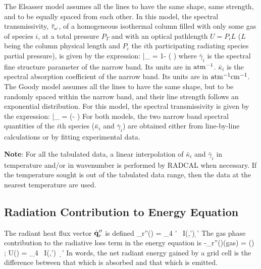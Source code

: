 The Elsasser model assumes all the lines to have the same shape, same strength,
and to be equally spaced from each other. In this model, the spectral
transmissivity, $\bar{\tau}_{\omega}$, of a homogeneous isothermal column filled
with only some gas of species $i$,
at a total pressure $P_T$ and with an optical pathlength $U = P_i L$ ($L$
being the column physical length and $P_i$ the $i$th participating radiating
species partial pressure), is given by the expression:
\be\label{eq::Elsasser}
    \bar{\tau}_{\om} = 1- \erf \left(   \right)
\ee
where $\bar{\gamma}_i$ is the spectral fine structure parameter of the narrow
band. Its units are in $\rm atm^{-1}$. $\bar{\kappa}_i$ is the spectral absorption coefficient of the narrow
band. Its units are in $\rm atm^{-1}cm^{-1}$. The Goody model assumes all the lines to have the same shape, but to be randomly
spaced within the narrow band, and their line strength follows an exponential
distribution. For this model, the spectral transmissivity is given by the expression:
\be\label{eq::Goody}
    \bar{\tau}_{\om} = \exp\left(- {\displaystyle {}}\right)
\ee
For both models, the two narrow band spectral quantities of the $i$th species ($\bar{\kappa}_i$ and
$\bar{\gamma}_i$) are obtained either from line-by-line calculations or by fitting
experimental data.

\textbf{Note}: For all the tabulated data, a linear interpolation of
$\bar{\kappa}_i$ and $\bar{\gamma}_i$ in temperature and/or in wavenumber is
performed by RADCAL when necessary. If the temperature sought is out of the
tabulated data range, then the data at the nearest temperature are used.


\subsection{Radiation Contribution to Energy Equation}

The radiant heat flux vector $\dot{\bf q}_r''$ is defined
\be \dbq_r''(\bx) = \int_{4\pi} \; \bs' \, I(\bx,\bs') \; \d \bs'   \ee
The gas phase contribution to the radiative loss term in the energy equation is
\be -\nabla\!\cdot \dbq_r''(\bx)(\mbox{gas}) =
    \kappa(\bx) \, \left[ U(\bx) - 4 \pi \, I_b(\bx) \right]  \quad ; \quad
    U(\bx) = \int_{4\pi} \, I(\bx,\bs') \, \d \bs'  \label{net_emission}
\ee
In words, the net radiant energy gained by a grid cell is the
difference between that which is absorbed and that which is emitted.


